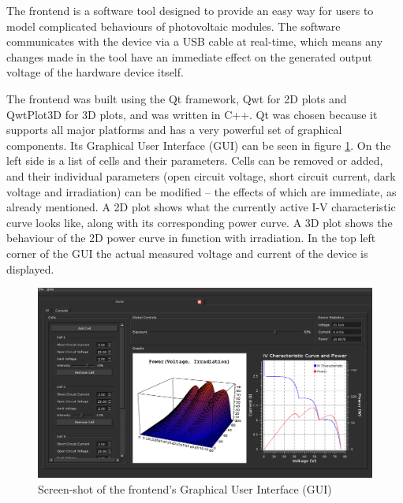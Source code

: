The frontend is a software tool designed  to  provide  an  easy way for users to
model complicated  behaviours of photovoltaic modules. The software communicates
with the device via  a  USB  cable at real-time, which means any changes made in
the tool have  an  immediate  effect  on  the  generated  output  voltage of the
hardware device itself.

The frontend was  built  using  the Qt framework\cite{ref:qt}, Qwt\cite{ref:qwt}
for 2D plots and QwtPlot3D\cite{ref:qwtplot3d} for 3D  plots, and was written in
C++.  Qt  was  chosen because it supports all major platforms  and  has  a  very
powerful set of graphical components. Its Graphical User Interface (GUI) can  be
seen  in  figure \ref{fig:frontend:screenshot}. On the left side is  a  list  of
cells and their parameters. Cells  can be removed or added, and their individual
parameters  (open  circuit  voltage,  short  circuit current, dark  voltage  and
irradiation) can be modified -- the  effects  of which are immediate, as already
mentioned. A 2D plot shows what the currently  active  I-V  characteristic curve
looks like, along  with  its  corresponding  power  curve.  A  3D plot shows the
behaviour  of  the  2D power curve in function with irradiation. In the top left
corner  of  the  GUI  the actual measured voltage and current of the  device  is
displayed.

\begin{figure}[th!]
    \centering
    \includegraphics[width=.8\textwidth]{images/frontend/frontend.png}
    \caption{Screen-shot of the frontend's Graphical User Interface (GUI)}
    \label{fig:frontend:screenshot}
\end{figure}


